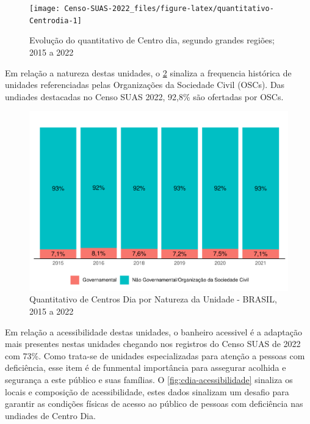 \documentclass[
  brazilian]{report}
\begin{document}
\begin{figure}
\texttt{[image: Censo-SUAS-2022\_files/figure-latex/quantitativo-Centrodia-1]} \caption[Evolução do quantitativo de Centro dia, segundo grandes regiões]{Evolução do quantitativo de Centro dia, segundo grandes regiões; 2015 a 2022}\label{fig:quantitativo-Centrodia}
\end{figure}

Em relação a natureza destas unidades, o \cref{fig:cdia-natureza}
sinaliza a frequencia histórica de unidades referenciadas pelas
Organizações da Sociedade Civil (OSCs). Das undiades destacadas no Censo
SUAS 2022, 92,8\% são ofertadas por OSCs.

\begin{figure}
\includegraphics{Censo-SUAS-2022_files/figure-latex/cdia-natureza-1} \caption[Quantitativo de Centros Dia por Natureza da Unidade - BRASIL, 2015 a 2022]{Quantitativo de Centros Dia por Natureza da Unidade - BRASIL, 2015 a 2022}\label{fig:cdia-natureza}
\end{figure}

Em relação a acessibilidade destas unidades, o banheiro acessivel é a
adaptação mais presentes nestas unidades chegando nos registros do Censo
SUAS de 2022 com 73\%. Como trata-se de unidades especializadas para
atenção a pessoas com deficiência, esse item é de funmental importância
para assegurar acolhida e segurança a este público e suas famílias. O
\cref{fig:cdia-acessibilidade} sinaliza os locais e composição de
acessibilidade, estes dados sinalizam um desafio para garantir as
condições físicas de acesso ao público de pessoas com deficiência nas
undiades de Centro Dia.
\end{document}
